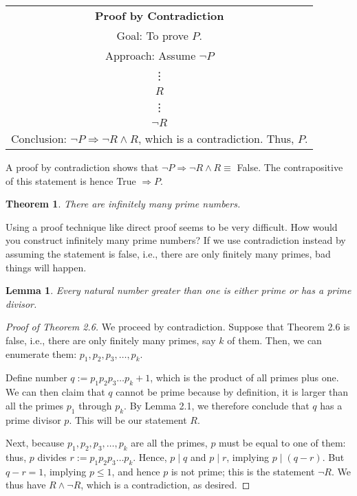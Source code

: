 \documentclass[12pt,a4paper]{article}
\newtheorem{theorem}{Theorem}[section]
\newtheorem{lemma}{Lemma}[section]
\theoremstyle{definition}
\begin{document}
\begin{center}
\begin{tabular}{|c|}
\hline 
\textbf{Proof by Contradiction} \\ 
Goal: To prove $P$. \\ 
Approach: Assume $\neg P$ \\ 
\vdots \\ 
$R$ \\ 
\vdots \\ 
$\neg R$ \\ 
Conclusion: $\neg P\Rightarrow\neg R\wedge R$, which is a contradiction. Thus, $P$. \\ 
\hline 
\end{tabular} 
\end{center}

A proof by contradiction shows that $\neg P\Rightarrow\neg R\wedge R\equiv$ False. The contrapositive of this statement is hence True $\Rightarrow P$.

\begin{theorem}\label{thm2.6}
There are infinitely many prime numbers.
\end{theorem}

Using a proof technique like direct proof seems to be very difficult. How would you construct infinitely many prime numbers? If we use contradiction instead by assuming the statement is false, i.e., there are only finitely many primes, bad things will happen.

\newpage

\begin{lemma}\label{lemma2.1}
Every natural number greater than one is either prime or has a prime divisor.
\end{lemma}

\begin{proof}[Proof of Theorem 2.6]
We proceed by contradiction. Suppose that Theorem 2.6 is false, i.e., there are only finitely many primes, say $k$ of them. Then, we can enumerate them: $p_1,p_2,p_3,\dots,p_k$.

Define number $q:=p_1p_2p_3\dots p_k+1$, which is the product of all primes plus one. We can then claim that $q$ cannot be prime because by definition, it is larger than all the primes $p_1$ through $p_k$. By Lemma 2.1, we therefore conclude that $q$ has a prime divisor $p$. This will be our statement $R$.

\bigbreak

Next, because $p_1,p_2,p_3,\dots,p_k$ are all the primes, $p$ must be equal to one of them: thus, $p$ divides $r:=p_1p_2p_3\dots p_k$. Hence, $p\mid q$ and $p\mid r$, implying $p\mid(q-r)$. But $q-r=1$, implying $p\leq 1$, and hence $p$ is not prime; this is the statement $\neg R$. We thus have $R\wedge\neg R$, which is a contradiction, as desired.
\end{proof}
\end{document}
